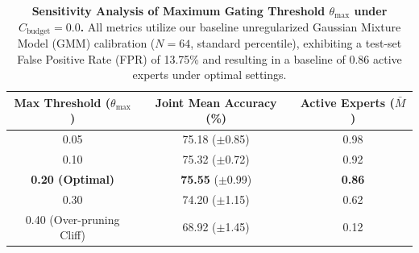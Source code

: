 \documentclass{article}
\theoremstyle{plain}
\theoremstyle{definition}
\theoremstyle{remark}
\begin{document}
\begin{table}[h]
\caption{\textbf{Sensitivity Analysis of Maximum Gating Threshold $\theta_{\max}$ under $C_{\text{budget}} = 0.0$.} All metrics utilize our baseline unregularized Gaussian Mixture Model (GMM) calibration ($N=64$, standard percentile), exhibiting a test-set False Positive Rate (FPR) of 13.75\% and resulting in a baseline of 0.86 active experts under optimal settings.}
\label{tab:app_thetamax_sweep}
\vskip 0.1in
\begin{center}
\begin{small}
\begin{sc}
\begin{tabular}{ccc}
\toprule
Max Threshold ($\theta_{\max}$) & Joint Mean Accuracy (\%) & Active Experts ($\bar{M}$) \\
\midrule
0.05 & 75.18 ($\pm$0.85) & 0.98 \\
0.10 & 75.32 ($\pm$0.72) & 0.92 \\
\textbf{0.20 (Optimal)} & \textbf{75.55} ($\pm$0.99) & \textbf{0.86} \\
0.30 & 74.20 ($\pm$1.15) & 0.62 \\
0.40 (Over-pruning Cliff) & 68.92 ($\pm$1.45) & 0.12 \\
\bottomrule
\end{tabular}
\end{sc}
\end{small}
\end{center}
\vskip -0.1in
\end{table}
\end{document}
